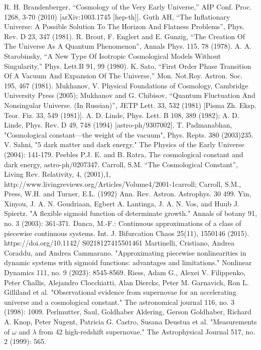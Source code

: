 \documentclass[12pt]{article}  %
\begin{document}
\begin{thebibliography}{99}
 R. H. Brandenberger, “Cosmology of the Very Early Universe,” AIP Conf. Proc. 1268, 3-70 (2010) [arXiv:1003.1745 [hep-th]].
Guth AH, “The Inflationary Universe: A Possible Solution To The Horizon And Flatness Problems”, Phys. Rev. D 23, 347 (1981).
 R. Brout, F. Englert and E. Gunzig, “The Creation Of The Universe As A Quantum Phenomenon”, Annals Phys. 115, 78 (1978).
 A. A. Starobinsky, “A New Type Of Isotropic Cosmological Models Without Singularity,” Phys. Lett.B 91, 99 (1980).
 K. Sato, “First Order Phase Transition Of A Vacuum And Expansion Of The Universe,” Mon. Not.Roy. Astron. Soc. 195, 467 (1981).
 Mukhanov, V. Physical Foundations of Cosmology, Cambridge University Press (2005); Mukhanov and G. Chibisov, “Quantum Fluctuation And Nonsingular Universe. (In Russian)”, JETP Lett. 33, 532 (1981) [Pisma Zh. Eksp. Teor. Fiz. 33, 549 (1981)].
 A. D. Linde, Phys. Lett. B 108, 389 (1982); A. D. Linde, Phys. Rev. D 49, 748 (1994) [astro-ph/9307002].
T. Padmanabhan, "Cosmological constant—the weight of the vacuum", Phys. Repts. 380 (2003)235. 
 V. Sahni, "5 dark matter and dark energy." The Physics of the Early Universe (2004): 141-179.
 Peebles P.J. E. and B. Ratra, The cosmological constant and dark energy, astro-ph/0207347. 
  Carroll, S.M. “The Cosmological Constant”, Living Rev. Relativity, 4, (2001),1, http://www.livingreviews.org/Articles/Volume4/2001-1carroll; Carroll, S.M., Press, W.H. and Turner, E.L. (1992) Ann. Rev. Astron. Astrophys. 30 499.
 Yin, Xinyou, J. A. N. Goudriaan, Egbert A. Lantinga, J. A. N. Vos, and Huub J. Spiertz. "A flexible sigmoid function of determinate growth." Annals of botany 91, no. 3 (2003): 361-371.
Danca, M.-F.: Continuous approximations of a class of piecewise continuous systems. Int. J. Bifurcation Chaos 25(11), 1550146 (2015). https://doi.org/10.1142/ S0218127415501461
 Martinelli, Cristiano, Andrea Coraddu, and Andrea Cammarano. "Approximating piecewise nonlinearities in dynamic systems with sigmoid functions: advantages and limitations." Nonlinear Dynamics 111, no. 9 (2023): 8545-8569.
 Riess, Adam G., Alexei V. Filippenko, Peter Challis, Alejandro Clocchiatti, Alan Diercks, Peter M. Garnavich, Ron L. Gilliland et al. "Observational evidence from supernovae for an accelerating universe and a cosmological constant." The astronomical journal 116, no. 3 (1998): 1009.
 Perlmutter, Saul, Goldhaber Aldering, Gerson Goldhaber, Richard A. Knop, Peter Nugent, Patricia G. Castro, Susana Deustua et al. "Measurements of $\omega$ and $\lambda$ from 42 high-redshift supernovae." The Astrophysical Journal 517, no. 2 (1999): 565.

\end{thebibliography}
\end{document}
